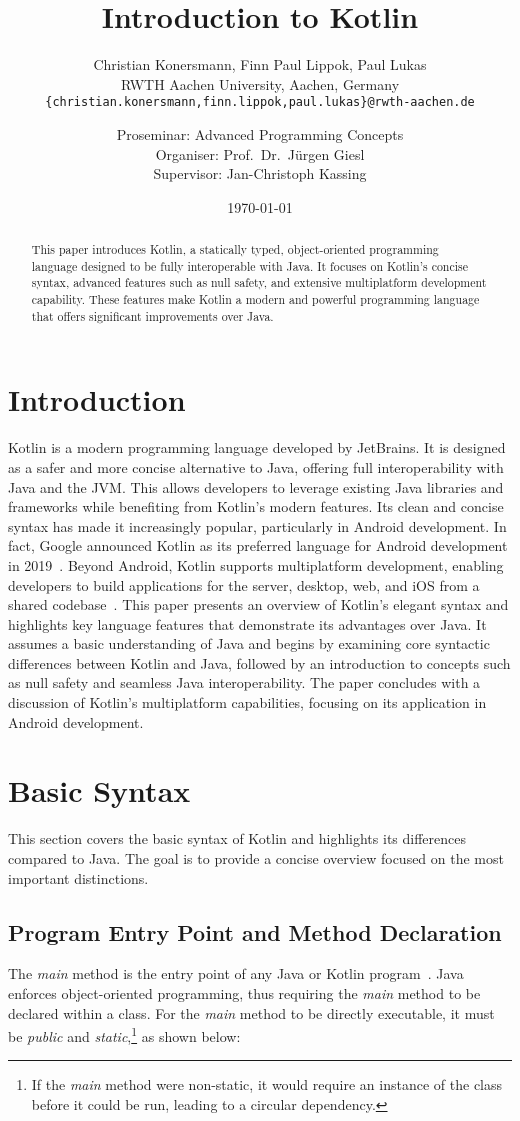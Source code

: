 \documentclass[a4paper,11pt]{article}
\title{\vspace{-0cm}\huge \bfseries Introduction to Kotlin}
\author{
  Christian Konersmann, Finn Paul Lippok, Paul Lukas\\[1ex]
  RWTH Aachen University, Aachen, Germany\\
  \texttt{\{christian.konersmann,finn.lippok,paul.lukas\}@rwth-aachen.de}\\
  \and
  Proseminar: Advanced Programming Concepts\\
  Organiser: Prof.\ Dr.\ Jürgen Giesl\\
  Supervisor: Jan-Christoph Kassing
}
\date{\today}
\begin{document}
\maketitle

\begin{abstract}
This paper introduces Kotlin, a statically typed, object-oriented programming language designed to be fully interoperable with Java. It focuses on Kotlin's concise syntax, advanced features such as null safety, and extensive multiplatform development capability. These features make Kotlin a modern and powerful programming language that offers significant improvements over Java.
\end{abstract}

\section{Introduction}
Kotlin is a modern programming language developed by JetBrains. It is designed as a safer and more concise alternative to Java, offering full interoperability with Java and the JVM\@. This allows developers to leverage existing Java libraries and frameworks while benefiting from Kotlin's modern features. Its clean and concise syntax has made it increasingly popular, particularly in Android development. In fact, Google announced Kotlin as its preferred language for Android development in 2019~\cite{intro-google}. Beyond Android, Kotlin supports multiplatform development, enabling developers to build applications for the server, desktop, web, and iOS from a shared codebase~\cite{intro-multiplatform-dev}. 
This paper presents an overview of Kotlin's elegant syntax and highlights key language features that demonstrate its advantages over Java. It assumes a basic understanding of Java and begins by examining core syntactic differences between Kotlin and Java, followed by an introduction to concepts such as null safety and seamless Java interoperability. The paper concludes with a discussion of Kotlin's multiplatform capabilities, focusing on its application in Android development.

\section{Basic Syntax}
This section covers the basic syntax of Kotlin and highlights its differences compared to Java. The goal is to provide a concise overview focused on the most important distinctions.

\subsection{Program Entry Point and Method Declaration}\label{sec:program-entry-point}
The \textit{main} method is the entry point of any Java or Kotlin program~\cite{program-entry-point}. Java enforces object-oriented programming, thus requiring the \textit{main} method to be declared within a class. For the \textit{main} method to be directly executable, it must be \textit{public} and \textit{static},\footnote{If the \textit{main} method were non-static, it would require an instance of the class before it could be run, leading to a circular dependency.} as shown below:
\end{document}
